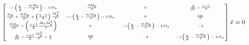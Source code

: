 \begin{equation*}
    \tiny
    \begin{bmatrix}
        -i \left( \frac{k}{\bar{A}} - \frac{mM_{\theta}}{\tilde{r}} \right) - \lambda M_x &
        -\frac{2 M_{\theta}}{\tilde{r}} &
        0 &
        \frac{\partial}{\partial \tilde{r}} + \frac{\gamma - 1}{\tilde{r}}\\ 
        \frac{ M_{\theta}}{\tilde{r}} + \frac{\partial M_{\theta}}{\partial \tilde{r}} + \left( \frac{\gamma - 1}{2} \right) \frac{M_{\theta}^3}{\tilde{r}}& 
        -i \left( \frac{k}{\bar{A}} - \frac{mM_{\theta}}{\tilde{r}} \right) - \lambda M_x & 
        0 &
        \frac{i m }{\tilde{r}}  \\
        \frac{\partial M_x}{\partial \tilde{r}} + \left( \frac{\gamma -1}{2}\frac{M_x M_{\theta}^2}{\tilde{r}}\right) & 0&
        -i \left( \frac{k}{\bar{A}} - \frac{mM_{\theta}}{\tilde{r}} \right) - \lambda M_x & -\lambda\\
        \frac{\partial}{\partial \tilde{r}} + \frac{\gamma +1}{2}\frac{M_{\theta}^2}{\tilde{r}} + \frac{1}{\tilde{r}} & \frac{im}{\tilde{r}} & -\lambda&  
        -i \left( \frac{k}{\bar{A}} - \frac{mM_{\theta}}{\tilde{r}} \right) - \lambda M_x 
    \end{bmatrix}\bar{x} = 0
\end{equation*}



